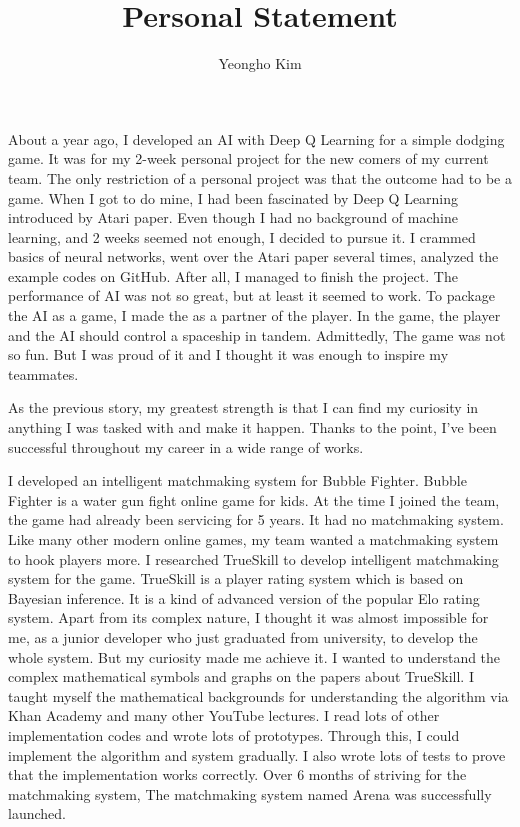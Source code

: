 \documentclass[11pt]{article}
\author{Yeongho Kim}
\date{}
\title{Personal Statement}
\begin{document}
\maketitle
\vspace{-6ex}

About a year ago, I developed an AI with Deep Q Learning for a simple dodging game.
It was for my 2-week personal project for the new comers of my current team.
The only restriction of a personal project was that the outcome had to be a game.
When I got to do mine, I had been fascinated by Deep Q Learning introduced by Atari paper.
Even though I had no background of machine learning, and 2 weeks seemed not enough, I decided to pursue it.
I crammed basics of neural networks, went over the Atari paper several times, analyzed the example codes on GitHub.
After all, I managed to finish the project.
The performance of AI was not so great, but at least it seemed to work.
To package the AI as a game, I made the as a partner of the player.
In the game, the player and the AI should control a spaceship in tandem.
Admittedly, The game was not so fun. But I was proud of it and I thought it was enough to inspire my teammates. 

As the previous story, my greatest strength is that
I can find my curiosity in anything I was tasked with and make it happen.
Thanks to the point, I've been successful throughout my career in a wide range of works. 

I developed an intelligent matchmaking system for Bubble Fighter.
Bubble Fighter is a water gun fight online game for kids.
At the time I joined the team, the game had already been servicing for 5 years.
It had no matchmaking system.
Like many other modern online games, my team wanted a matchmaking system to hook players more.
I researched TrueSkill to develop intelligent matchmaking system for the game.
TrueSkill is a player rating system which is based on Bayesian inference.
It is a kind of advanced version of the popular Elo rating system.
Apart from its complex nature, I thought it was almost impossible for me, as a junior developer who just graduated from university, to develop the whole system.
But my curiosity made me achieve it.
I wanted to understand the complex mathematical symbols and graphs on the papers about TrueSkill.
I taught myself the mathematical backgrounds for understanding the algorithm via Khan Academy and many other YouTube lectures.
I read lots of other implementation codes and wrote lots of prototypes.
Through this, I could implement the algorithm and system gradually.
I also wrote lots of tests to prove that the implementation works correctly.
Over 6 months of striving for the matchmaking system, The matchmaking system named Arena was successfully launched.
\end{document}
